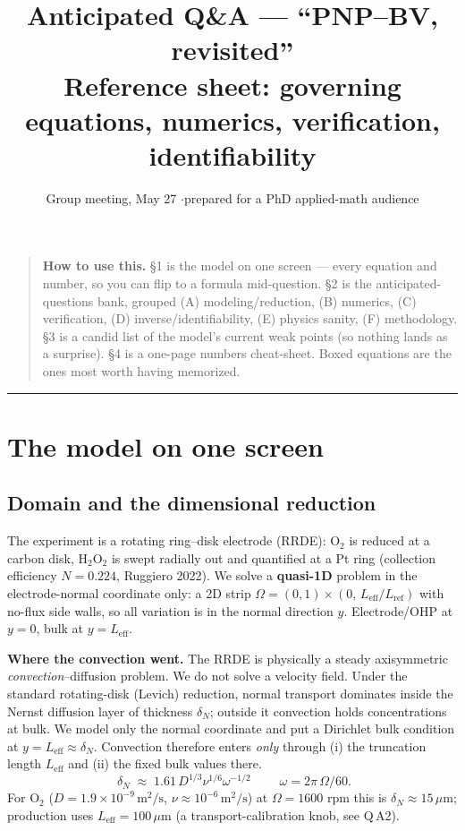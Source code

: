 \documentclass[11pt]{article}
\title{\vspace{-2.2em}\textbf{Anticipated Q\&A --- ``PNP--BV, revisited''}\\[2pt]
\large Reference sheet: governing equations, numerics, verification, identifiability}
\author{Group meeting, May 27 \quad$\cdot$\quad prepared for a PhD applied-math audience}
\date{}
\newcommand{\Leff}{L_{\mathrm{eff}}}
\begin{document}
\maketitle
\vspace{-2.5em}

\begin{quote}\small
\textbf{How to use this.} \S1 is the model on one screen --- every equation
and number, so you can flip to a formula mid-question. \S2 is the
anticipated-questions bank, grouped (A) modeling/reduction, (B) numerics,
(C) verification, (D) inverse/identifiability, (E) physics sanity,
(F) methodology. \S3 is a candid list of the model's current weak points
(so nothing lands as a surprise). \S4 is a one-page numbers cheat-sheet.
Boxed equations are the ones most worth having memorized.
\end{quote}

\tableofcontents
\medskip\hrule

\section{The model on one screen}\label{sec:model}

\subsection{Domain and the dimensional reduction}
The experiment is a rotating ring--disk electrode (RRDE): O$_2$ is reduced
at a carbon disk, H$_2$O$_2$ is swept radially out and quantified at a Pt
ring (collection efficiency $N=0.224$, Ruggiero 2022). We solve a
\textbf{quasi-1D} problem in the electrode-normal coordinate only: a 2D
strip $\Omega=(0,1)\times(0,\,\Leff/L_{\mathrm{ref}})$ with no-flux side
walls, so all variation is in the normal direction $y$. Electrode/OHP at
$y=0$, bulk at $y=\Leff$.

\textbf{Where the convection went.} The RRDE is physically a steady
axisymmetric \emph{convection}--diffusion problem. We do not solve a
velocity field. Under the standard rotating-disk (Levich) reduction,
normal transport dominates inside the Nernst diffusion layer of thickness
$\delta_N$; outside it convection holds concentrations at bulk. We model
only the normal coordinate and put a Dirichlet bulk condition at
$y=\Leff\approx\delta_N$. Convection therefore enters \emph{only} through
(i) the truncation length $\Leff$ and (ii) the fixed bulk values there.
\[
  \boxed{\;\delta_N \;\approx\; 1.61\,D^{1/3}\nu^{1/6}\omega^{-1/2}\;}
  \qquad \omega = 2\pi\,\Omega/60 .
\]
For O$_2$ ($D=1.9\times10^{-9}\,\mathrm{m^2/s}$, $\nu\approx10^{-6}\,
\mathrm{m^2/s}$) at $\Omega=1600$ rpm this is $\delta_N\approx15\,\mu$m;
production uses $\Leff=100\,\mu$m (a transport-calibration knob, see Q\,A2).
\end{document}
